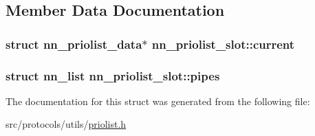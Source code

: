 \subsection{Member Data Documentation}
\subsubsection[{current}]{\setlength{\rightskip}{0pt plus 5cm}struct {\bf nn\+\_\+priolist\+\_\+data}$\ast$ nn\+\_\+priolist\+\_\+slot\+::current}\hypertarget{structnn__priolist__slot_a8edde8ff839385d6f374db37f20dbafe}{}\label{structnn__priolist__slot_a8edde8ff839385d6f374db37f20dbafe}
\subsubsection[{pipes}]{\setlength{\rightskip}{0pt plus 5cm}struct {\bf nn\+\_\+list} nn\+\_\+priolist\+\_\+slot\+::pipes}\hypertarget{structnn__priolist__slot_a6bbb571b29ea6f12d11cb1ef2cf24fde}{}\label{structnn__priolist__slot_a6bbb571b29ea6f12d11cb1ef2cf24fde}


The documentation for this struct was generated from the following file\+:\begin{DoxyCompactItemize}
\item 
src/protocols/utils/\hyperlink{priolist_8h}{priolist.\+h}\end{DoxyCompactItemize}
